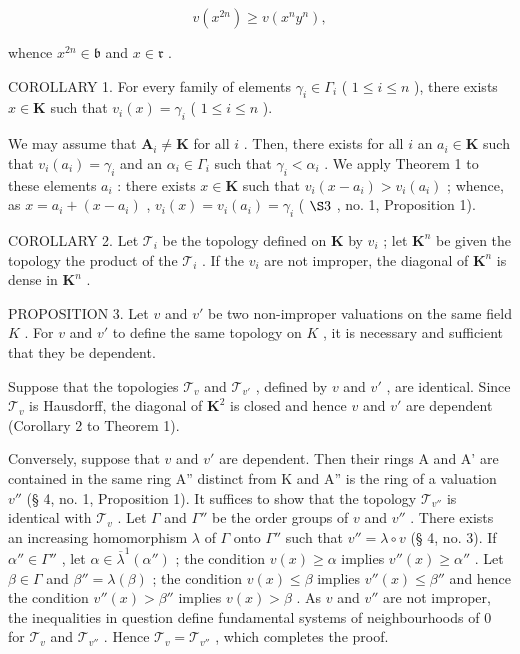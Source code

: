 \[
v (x ^ {2 n}) \geqslant v (x ^ {n} y ^ {n}),
\]

whence \(x^{2n} \in \mathfrak{b}\) and \(x \in \mathfrak{r}\) .

COROLLARY 1. For every family of elements \(\gamma_{i} \in \Gamma_{i}\) ( \(1 \leqslant i \leqslant n\) ), there exists \(x \in \mathbf{K}\) such that \(v_{i}(x) = \gamma_{i}\) ( \(1 \leqslant i \leqslant n\) ).

We may assume that \(\mathbf{A}_i \neq \mathbf{K}\) for all \(i\) . Then, there exists for all \(i\) an \(a_i \in \mathbf{K}\) such that \(v_i(a_i) = \gamma_i\) and an \(\alpha_i \in \Gamma_i\) such that \(\gamma_i < \alpha_i\) . We apply Theorem 1 to these elements \(a_i\) : there exists \(x \in \mathbf{K}\) such that \(v_i(x - a_i) > v_i(a_i)\) ; whence, as \(x = a_i + (x - a_i)\) , \(v_i(x) = v_i(a_i) = \gamma_i\) ( \(\S 3\) , no. 1, Proposition 1).

COROLLARY 2. Let \(\mathcal{T}_i\) be the topology defined on \(\mathbf{K}\) by \(v_i\) ; let \(\mathbf{K}^n\) be given the topology the product of the \(\mathcal{T}_i\) . If the \(v_i\) are not improper, the diagonal of \(\mathbf{K}^n\) is dense in \(\mathbf{K}^n\) .

PROPOSITION 3. Let \(v\) and \(v'\) be two non-improper valuations on the same field \(K\) . For \(v\) and \(v'\) to define the same topology on \(K\) , it is necessary and sufficient that they be dependent.

Suppose that the topologies \(\mathcal{T}_v\) and \(\mathcal{T}_{v'}\) , defined by \(v\) and \(v'\) , are identical. Since \(\mathcal{T}_v\) is Hausdorff, the diagonal of \(\mathbf{K}^2\) is closed and hence \(v\) and \(v'\) are dependent (Corollary 2 to Theorem 1).

Conversely, suppose that \(v\) and \(v'\) are dependent. Then their rings A and A' are contained in the same ring A'' distinct from K and A'' is the ring of a valuation \(v''\) (§ 4, no. 1, Proposition 1). It suffices to show that the topology \(\mathcal{T}_{v''}\) is identical with \(\mathcal{T}_v\) . Let \(\Gamma\) and \(\Gamma''\) be the order groups of \(v\) and \(v''\) . There exists an increasing homomorphism \(\lambda\) of \(\Gamma\) onto \(\Gamma''\) such that \(v'' = \lambda \circ v\) (§ 4, no. 3). If \(\alpha'' \in \Gamma''\) , let \(\alpha \in \overline{\lambda}^{1}(\alpha'')\) ; the condition \(v(x) \geqslant \alpha\) implies \(v''(x) \geqslant \alpha''\) . Let \(\beta \in \Gamma\) and \(\beta'' = \lambda(\beta)\) ; the condition \(v(x) \leqslant \beta\) implies \(v''(x) \leqslant \beta''\) and hence the condition \(v''(x) > \beta''\) implies \(v(x) > \beta\) . As \(v\) and \(v''\) are not improper, the inequalities in question define fundamental systems of neighbourhoods of 0 for \(\mathcal{T}_v\) and \(\mathcal{T}_{v''}\) . Hence \(\mathcal{T}_v = \mathcal{T}_{v''}\) , which completes the proof.

